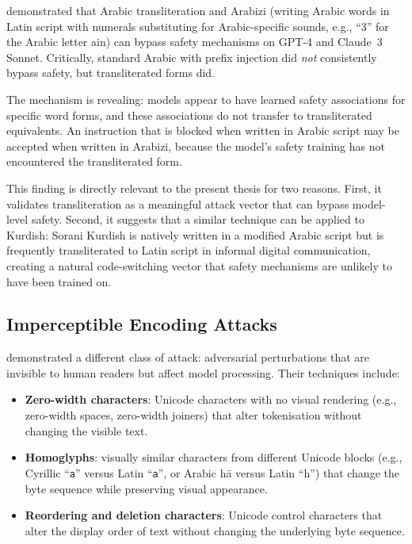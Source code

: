 \textcite{alghanim2024jailbreaking} demonstrated that Arabic transliteration and Arabizi (writing Arabic words in Latin script with numerals substituting for Arabic-specific sounds, e.g., ``3'' for the Arabic letter ain) can bypass safety mechanisms on GPT-4 and Claude~3 Sonnet.  Critically, standard Arabic with prefix injection did \emph{not} consistently bypass safety, but transliterated forms did.

The mechanism is revealing: models appear to have learned safety associations for specific word forms, and these associations do not transfer to transliterated equivalents.  An instruction that is blocked when written in Arabic script may be accepted when written in Arabizi, because the model's safety training has not encountered the transliterated form.

This finding is directly relevant to the present thesis for two reasons.  First, it validates transliteration as a meaningful attack vector that can bypass model-level safety.  Second, it suggests that a similar technique can be applied to Kurdish: Sorani Kurdish is natively written in a modified Arabic script but is frequently transliterated to Latin script in informal digital communication, creating a natural code-switching vector that safety mechanisms are unlikely to have been trained on.

\subsection{Imperceptible Encoding Attacks}

\textcite{boucher2022bad} demonstrated a different class of attack: adversarial perturbations that are invisible to human readers but affect model processing.  Their techniques include:

\begin{itemize}[nosep]
  \item \textbf{Zero-width characters}: Unicode characters with no visual rendering (e.g., zero-width spaces, zero-width joiners) that alter tokenisation without changing the visible text.
  \item \textbf{Homoglyphs}: visually similar characters from different Unicode blocks (e.g., Cyrillic ``\texttt{a}'' versus Latin ``\texttt{a}'', or Arabic h\={a} versus Latin ``h'') that change the byte sequence while preserving visual appearance.
  \item \textbf{Reordering and deletion characters}: Unicode control characters that alter the display order of text without changing the underlying byte sequence.
\end{itemize}

